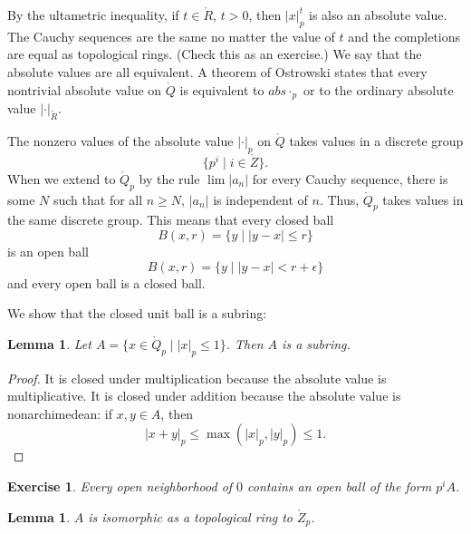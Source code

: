 \documentclass{amsart}
\newtheorem{lemma}[equation]{Lemma}
\newtheorem{exercise}{Exercise}
\def\abs#1{{|#1|}}
\begin{document}
By the ultametric inequality, if $t\in \ring{R}$, $t>0$, then
$\abs{x}_p^t$ is also an absolute value.  The Cauchy sequences are the
same no matter the value of $t$ and the completions are equal as
topological rings.  (Check this as an exercise.)  We say that the
absolute values are all equivalent.  A theorem of Ostrowski
\cite[Theorem 6.15]{knapp-advanced} states that every nontrivial
absolute value on $\ring{Q}$ is equivalent to $abs{\cdot}_p$ or to the
ordinary absolute value $\abs{\cdot}_{\ring{R}}$.

The nonzero values of the
absolute value $\abs{\cdot}_p$ on $\ring{Q}$ takes values in a discrete group
\[
\{p^i \mid i\in \ring{Z}\}.
\]
When we extend to $\ring{Q}_p$ by the rule $\lim \abs{a_n}$ for every Cauchy
sequence, there is some
$N$ such that for all $n\ge N$, $\abs{a_n}$ is independent of $n$.
Thus, $\ring{Q}_p$ takes values in the same discrete group.
This means that every closed ball 
\[
B(x,r) = \{y\mid \abs{y-x}\le r\}
\]
is an open ball
\[
B(x,r) = \{y\mid \abs{y-x}< r+\epsilon\}
\]
and every open ball is a closed ball.

We show that the closed unit ball is a subring:

\begin{lemma}
Let $A = \{x\in \ring{Q}_p \mid \abs{x}_p\le 1\}$.
Then $A$ is a subring.
\end{lemma}

\begin{proof} It is closed under multiplication because the absolute
value is multiplicative.  It is closed under addition because the absolute
value is nonarchimedean:  if $x,y\in A$, then
\[
\abs{x + y}_p \le \max(\abs{x}_p,\abs{y}_p)\le 1.
\]
\end{proof}

\begin{exercise} Every open neighborhood of $0$ contains an open ball of the
form $p^i A$.
\end{exercise}


\begin{lemma}  $A$ is isomorphic as a topological ring to $\ring{Z}_p$.
\end{lemma}
\end{document}
